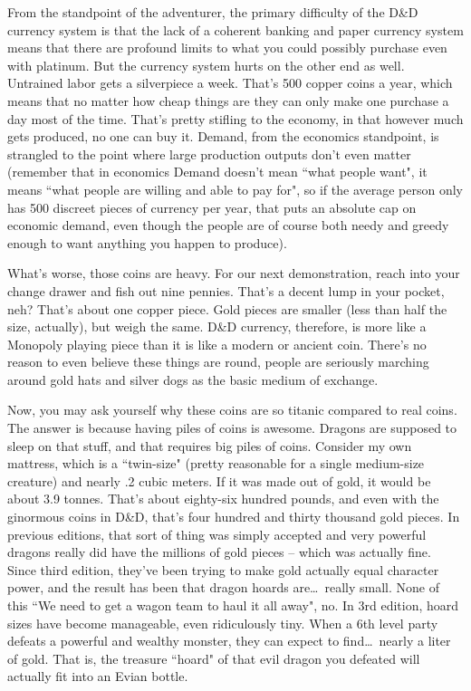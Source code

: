 From the standpoint of the adventurer, the primary difficulty of the D\&D currency system is that the lack of a coherent banking and paper currency system means that there are profound limits to what you could possibly purchase even with platinum. But the currency system hurts on the other end as well. Untrained labor gets a silverpiece a week. That's 500 copper coins a year, which means that no matter how cheap things are they can only make one purchase a day most of the time. That's pretty stifling to the economy, in that however much gets produced, no one can buy it. Demand, from the economics standpoint, is strangled to the point where large production outputs don't even matter (remember that in economics Demand doesn't mean ``what people want", it means ``what people are willing and able to pay for", so if the average person only has 500 discreet pieces of currency per year, that puts an absolute cap on economic demand, even though the people are of course both needy and greedy enough to want anything you happen to produce).

What's worse, those coins are heavy. For our next demonstration, reach into your change drawer and fish out nine pennies. That's a decent lump in your pocket, neh? That's about one copper piece. Gold pieces are smaller (less than half the size, actually), but weigh the same. D\&D currency, therefore, is more like a Monopoly playing piece than it is like a modern or ancient coin. There's no reason to even believe these things are round, people are seriously marching around gold hats and silver dogs as the basic medium of exchange.

Now, you may ask yourself why these coins are so titanic compared to real coins. The answer is because having piles of coins is awesome. Dragons are supposed to sleep on that stuff, and that requires big piles of coins. Consider my own mattress, which is a ``twin-size" (pretty reasonable for a single medium-size creature) and nearly .2 cubic meters. If it was made out of gold, it would be about 3.9 tonnes. That's about eighty-six hundred pounds, and even with the ginormous coins in D\&D, that's four hundred and thirty thousand gold pieces. In previous editions, that sort of thing was simply accepted and very powerful dragons really did have the millions of gold pieces -- which was actually fine. Since third edition, they've been trying to make gold actually equal character power, and the result has been that dragon hoards are\ldots\  really small. None of this ``We need to get a wagon team to haul it all away", no. In 3rd edition, hoard sizes have become manageable, even ridiculously tiny. When a 6th level party defeats a powerful and wealthy monster, they can expect to find\ldots\  nearly a liter of gold. That is, the treasure ``hoard" of that evil dragon you defeated will actually fit into an Evian bottle.

